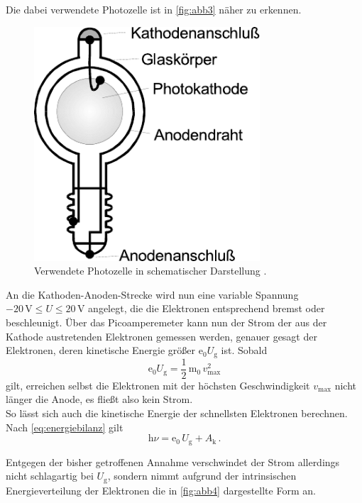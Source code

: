 Die dabei verwendete Photozelle ist in \autoref{fig:abb3} näher zu erkennen.

\begin{figure}[H]
    \centering
    \includegraphics[width=0.75\textwidth]{figures/Abb3.pdf}
    \caption{Verwendete Photozelle in schematischer Darstellung \cite{ap10}.}
    \label{fig:abb3}
\end{figure}

An die Kathoden-Anoden-Strecke wird nun eine variable Spannung $-20 \,\unit{\volt} \leq U \leq 20 \,\unit{\volt}$ angelegt, die die Elektronen entsprechend bremst oder beschleunigt.
Über das Picoamperemeter kann nun der Strom der aus der Kathode austretenden Elektronen gemessen werden, genauer gesagt der Elektronen, deren kinetische Energie größer $\text{e}_0 U_\text{g}$ ist. 
Sobald
\begin{equation*}
    \text{e}_0 U_\text{g} = \dfrac{1}{2} \, \text{m}_0 \, v^2_\text{max}
\end{equation*}
gilt, erreichen selbst die Elektronen mit der höchsten Geschwindigkeit $v_\text{max}$ nicht länger die Anode, es fließt also kein Strom. \\

So lässt sich auch die kinetische Energie der schnellsten Elektronen berechnen.
Nach \eqref{eq:energiebilanz} gilt
\begin{equation*}
    \text{h} \nu = \text{e}_0 \,U_\text{g} + A_\text{k} \,.
\end{equation*}

Entgegen der bisher getroffenen Annahme verschwindet der Strom allerdings nicht schlagartig bei $U_\text{g}$, sondern nimmt aufgrund der intrinsischen Energieverteilung der Elektronen die in \autoref{fig:abb4}
dargestellte Form an.

